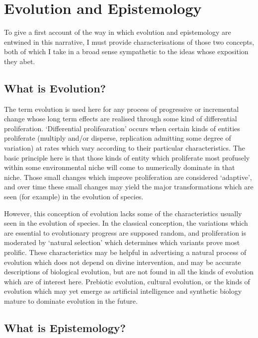 
\section{Evolution and Epistemology}

To give a first account of the way in which evolution and epistemology are entwined in this narrative, I must provide characterisations of those two concepts, both of which I take in a broad sense sympathetic to the ideas whose exposition they abet.

\subsection{What is Evolution?}

The term evolution is used here for any process of progressive or incremental change whose long term effects are realised through some kind of differential proliferation.
`Differential prolifearation' occurs when certain kinds of entities proliferate (multiply and/or disperse, replication admitting some degree of variation) at rates which vary according to their particular characteristics.
The basic principle here is that those kinds of entity which proliferate most profusely within some environmental niche will come to numerically dominate in that niche.
Those small changes which improve proliferation are considered `adaptive', and over time these small changes may yield the major transformations which are seen (for example) in the evolution of species.

However, this conception of evolution lacks some of the characteristics usually seen in the evolution of species.
In the classical conception, the variations which are essential to evolutionary progress are supposed random, and proliferation is moderated by `natural selection' which determines which variants prove most prolific.
These characteristics may be helpful in advertising a natural process of evolution which does not depend on divine intervention, and may be accurate descriptions of biological evolution, but are not found in all the kinds of evolution which are of interest here.
Prebiotic evolution, cultural evolution, or the kinds of evolution which may yet emerge as artificial intelligence and synthetic biology mature to dominate evolution in the future.

\subsection{What is Epistemology?}

